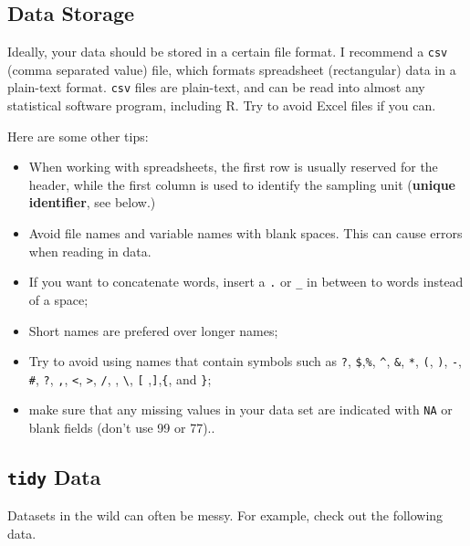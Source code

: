 \documentclass[]{book}
\providecommand{\tightlist}{%
  \setlength{\itemsep}{0pt}\setlength{\parskip}{0pt}}
\begin{document}
\subsection{Data Storage}\label{data-storage}

Ideally, your data should be stored in a certain file format. I
recommend a \texttt{csv} (comma separated value) file, which formats
spreadsheet (rectangular) data in a plain-text format. \texttt{csv}
files are plain-text, and can be read into almost any statistical
software program, including R. Try to avoid Excel files if you can.

Here are some other tips:

\begin{itemize}
\tightlist
\item
  When working with spreadsheets, the first row is usually reserved for
  the header, while the first column is used to identify the sampling
  unit (\textbf{unique identifier}, see below.)
\item
  Avoid file names and variable names with blank spaces. This can cause
  errors when reading in data.
\item
  If you want to concatenate words, insert a \texttt{.} or \texttt{\_}
  in between to words instead of a space;
\item
  Short names are prefered over longer names;
\item
  Try to avoid using names that contain symbols such as \texttt{?},
  \texttt{\$},\texttt{\%}, \texttt{\^{}}, \texttt{\&}, \texttt{*},
  \texttt{(}, \texttt{)}, \texttt{-}, \texttt{\#}, \texttt{?},
  \texttt{,}, \texttt{\textless{}}, \texttt{\textgreater{}}, \texttt{/},
  \texttt{\textbar{}}, \texttt{\textbackslash{}}, \texttt{{[}}
  ,\texttt{{]}},\texttt{\{}, and \texttt{\}};
\item
  make sure that any missing values in your data set are indicated with
  \texttt{NA} or blank fields (don't use 99 or 77)..
\end{itemize}

\subsection{\texorpdfstring{\texttt{tidy}
Data}{tidy Data}}\label{tidy-data}

Datasets in the wild can often be messy. For example, check out the
following data.
\end{document}
